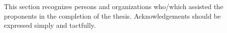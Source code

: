 This section recognizes persons and organizations who/which assisted the proponents in the completion of the thesis. Acknowledgements should be expressed simply and tactfully.